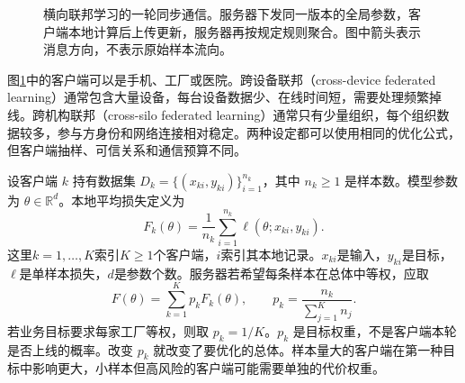 \begin{figure}[htbp]
\centering
{}
\caption{横向联邦学习的一轮同步通信。服务器下发同一版本的全局参数，客户端本地计算后上传更新，服务器再按规定规则聚合。图中箭头表示消息方向，不表示原始样本流向。}
\label{fig:federated-basic-loop}
\end{figure}

图\ref{fig:federated-basic-loop}中的客户端可以是手机、工厂或医院。跨设备联邦（cross-device federated learning）通常包含大量设备，每台设备数据少、在线时间短，需要处理频繁掉线。跨机构联邦（cross-silo federated learning）通常只有少量组织，每个组织数据较多，参与方身份和网络连接相对稳定。两种设定都可以使用相同的优化公式，但客户端抽样、可信关系和通信预算不同。

设客户端 $k$ 持有数据集 $D_k=\{(x_{ki},y_{ki})\}_{i=1}^{n_k}$，其中 $n_k\geq1$ 是样本数。模型参数为 $\theta\in\mathbb R^d$。本地平均损失定义为
\begin{equation}
 F_k(\theta)=\frac{1}{n_k}\sum_{i=1}^{n_k}\ell(\theta;x_{ki},y_{ki}).
\end{equation}
这里$k=1,\ldots,K$索引$K\geq1$个客户端，$i$索引其本地记录。$x_{ki}$是输入，$y_{ki}$是目标，$\ell$是单样本损失，$d$是参数个数。服务器若希望每条样本在总体中等权，应取
\begin{equation}
 F(\theta)=\sum_{k=1}^{K}p_kF_k(\theta),\qquad
 p_k=\frac{n_k}{\sum_{j=1}^{K}n_j}.
 \label{eq:fed-global-objective-rewrite}
\end{equation}
若业务目标要求每家工厂等权，则取 $p_k=1/K$。$p_k$ 是目标权重，不是客户端本轮是否上线的概率。改变 $p_k$ 就改变了要优化的总体。样本量大的客户端在第一种目标中影响更大，小样本但高风险的客户端可能需要单独的代价权重。

